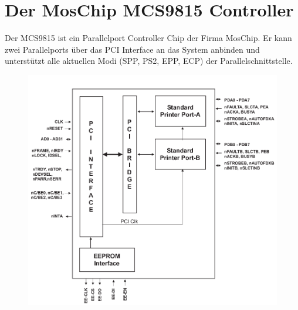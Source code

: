 \documentclass[a4paper,11pt]{article}
\begin{document}
\section{Der MosChip MCS9815 Controller}

Der MCS9815 ist ein Parallelport Controller Chip der Firma MosChip. Er kann
zwei Parallelports über das PCI Interface an das System anbinden und unterstützt alle
aktuellen Modi (SPP, PS2, EPP, ECP) der Parallelschnittstelle.

\begin{figure}[h]
 \centering
 \includegraphics[bb=0 0 724 671,scale=0.5]{./pics/mcs9815_block_diagram.png}
\end{figure}



\end{document}
